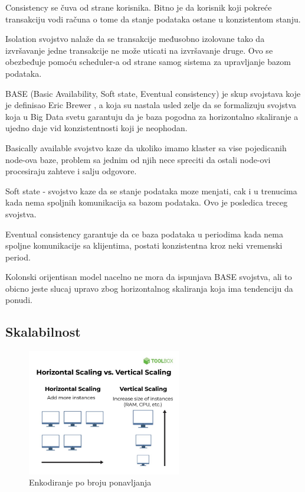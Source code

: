 \documentclass[12pt,oneside]{memoir}
\begin{document}
Consistency se čuva od strane korisnika. Bitno je da korisnik koji pokreće transakciju vodi računa o tome da stanje podataka ostane u konzistentom stanju.

Isolation svojstvo nalaže da se transakcije međusobno izolovane tako da izvršavanje jedne transakcije ne može uticati na izvršavanje druge. Ovo se obezbeđuje pomoću scheduler-a od strane samog sistema za upravljanje bazom podataka.

BASE (Basic Availability, Soft state, Eventual consistency) je skup svojstava koje je definisao Eric Brewer , a koja su nastala usled zelje da se formalizuju svojstva koja u Big Data svetu garantuju da je baza pogodna za horizontalno skaliranje a ujedno daje vid konzistentnosti koji je neophodan. 

Basically available  svojstvo kaze da ukoliko imamo klaster sa vise pojedicanih node-ova baze, problem sa jednim od njih nece spreciti da ostali node-ovi procesiraju zahteve i salju odgovore.

Soft state -  svojstvo kaze da se stanje podataka moze menjati, cak i u trenucima kada nema spoljnih komunikacija sa bazom podataka. Ovo je posledica treceg svojstva.

Eventual consistency garantuje da ce baza podataka u periodima kada nema spoljne komunikacije sa klijentima, postati konzistentna kroz neki vremenski period. 

Kolonski orijentisan model nacelno ne mora da ispunjava BASE svojstva, ali to obicno jeste slucaj upravo zbog horizontalnog skaliranja koja ima tendenciju da ponudi.


\subsection{Skalabilnost}

\begin{figure}[!ht]
  \centering
  \includegraphics[width=0.6\textwidth]{horizontal-vertical-scaling.jpg}
  \caption{Enkodiranje po broju ponavljanja}
  \label{fig:grafikon}
\end{figure}
\end{document}
